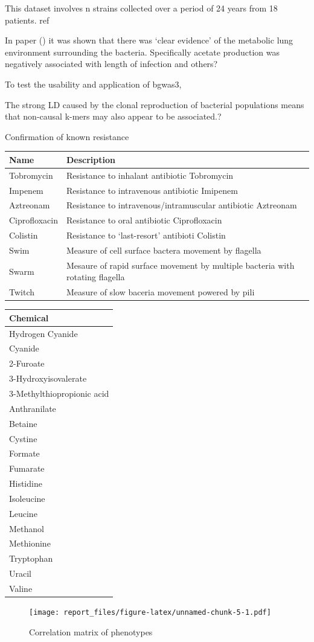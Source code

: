 \documentclass[]{DissertateUSU}
\begin{document}
This dataset involves n strains collected over a period of 24 years from
18 patients. ref

In paper () it was shown that there was `clear evidence' of the
metabolic lung environment surrounding the bacteria. Specifically
acetate production was negatively associated with length of infection
and others?

To test the usability and application of bgwas3,

The strong LD caused by the clonal reproduction of bacterial populations
means that non-causal k-mers may also appear to be associated.?

Confirmation of known resistance

\begin{longtable}[]{@{}ll@{}}
\toprule
Name & Description\tabularnewline
\midrule
\endhead
Tobromycin & Resistance to inhalant antibiotic Tobromycin\tabularnewline
Impenem & Resistance to intravenous antibiotic Imipenem\tabularnewline
Aztreonam & Resistance to intravenous/intramuscular antibiotic
Aztreonam\tabularnewline
Ciprofloxacin & Resistance to oral antibiotic
Ciprofloxacin\tabularnewline
Colistin & Resistance to `last-resort' antibioti Colistin\tabularnewline
Swim & Measure of cell surface bactera movement by
flagella\tabularnewline
Swarm & Mesaure of rapid surface movement by multiple bacteria with
rotating flagella\tabularnewline
Twitch & Measure of slow baceria movement powered by pili\tabularnewline
\bottomrule
\end{longtable}

\begin{longtable}[]{@{}l@{}}
\toprule
Chemical\tabularnewline
\midrule
\endhead
Hydrogen Cyanide\tabularnewline
Cyanide\tabularnewline
2-Furoate\tabularnewline
3-Hydroxyisovalerate\tabularnewline
3-Methylthiopropionic acid\tabularnewline
Anthranilate\tabularnewline
Betaine\tabularnewline
Cystine\tabularnewline
Formate\tabularnewline
Fumarate\tabularnewline
Histidine\tabularnewline
Isoleucine\tabularnewline
Leucine\tabularnewline
Methanol\tabularnewline
Methionine\tabularnewline
Tryptophan\tabularnewline
Uracil\tabularnewline
Valine\tabularnewline
\bottomrule
\end{longtable}

\begin{figure}
\centering
\texttt{[image: report\_files/figure-latex/unnamed-chunk-5-1.pdf]}
\caption{\label{fig:cormat}Correlation matrix of phenotypes}
\end{figure}
\end{document}
